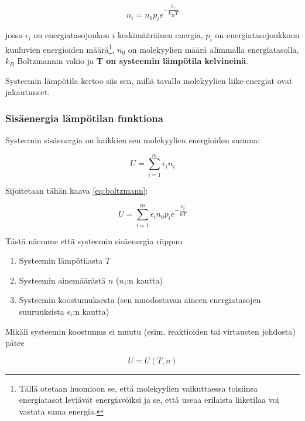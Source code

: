 \documentclass[12pt,a4paper,finnish]{book}
\begin{document}
\begin{equation}
\label{eq:boltzmann}
 n_i = n_0p_ie^{-\dfrac{\epsilon_i}{k_BT}}
\end{equation}

jossa $\epsilon_i$ on energiatasojoukon $i$ keskimääräinen energia, $p_i$ on energiatasojoukkoon kuuluvien energioiden 
määrä\footnote{Tällä otetaan huomioon se, että molekyylien vaikuttaessa toisiinsa energiatasot leviävät energiavöiksi ja 
se, että useaa erilaista liiketilaa voi vastata sama energia.}, $n_0$ on molekyylien määrä alimmalla 
energiatasolla, $k_B$ Boltzmannin vakio ja \textbf{T on systeemin lämpötila kelvineinä}.


Systeemin lämpötila kertoo siis sen, millä tavalla molekyylien liike-energiat ovat jakautuneet.

\subsubsection{Sisäenergia lämpötilan funktiona}

Systeemin sisäenergia on kaikkien sen molekyylien energioiden summa:

\begin{equation}
 U = \sum_{i=1}^m\epsilon_in_i
\end{equation}

Sijoitetaan tähän kaava \ref{eq:boltzmann}:

\begin{equation}
 U = \sum_{i=1}^m\epsilon_in_0p_ie^{-\dfrac{\epsilon_i}{kT}}
\end{equation}

Tästä näemme että systeemin sisäenergia riippuu

\begin{enumerate}
 \item Systeemin lämpötilasta $T$
 \item Systeemin ainemäärästä $n$ ($n_i$:n kautta)
 \item Systeemin koostumuksesta (sen muodostavan aineen energiatasojen suuruuksista $\epsilon_i$:n kautta)
\end{enumerate}

Mikäli systeemin koostumus ei muutu (esim. reaktioiden tai virtausten johdosta) pätee

\begin{equation}
 U = U(T, n)
\end{equation}
\end{document}
